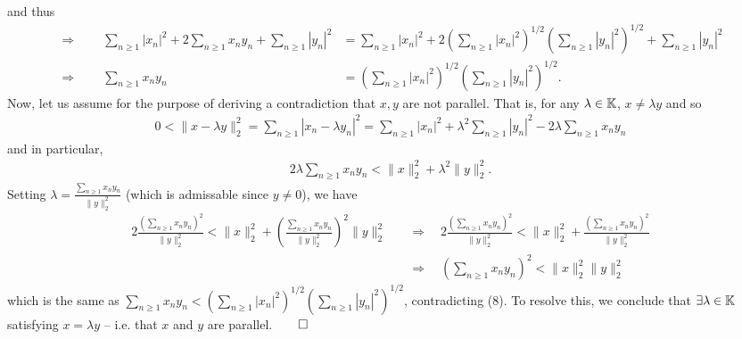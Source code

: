 \documentclass[10pt]{article}
\newcommand{\1}[1]{\mathbbm{1}_{#1}} \newcommand{\mc}[1]{\mathcal{#1}}
\begin{document}
    and thus
    \begin{align*}
        \Rightarrow\qquad\sum_{n\geq 1}|x_n|^2+2\sum_{n\geq 1}x_ny_n+\sum_{n\geq 1}|y_n|^2&=\sum_{n\geq 1}|x_n|^2+2\left(\sum_{n\geq 1}|x_n|^2\right)^{1/2}\left(\sum_{n\geq 1}|y_n|^2\right)^{1/2}+\sum_{n\geq 1}|y_n|^2\\
        \Rightarrow\qquad\sum_{n\geq 1}x_ny_n&=\left(\sum_{n\geq 1}|x_n|^2\right)^{1/2}\left(\sum_{n\geq 1}|y_n|^2\right)^{1/2}.\tag{8}
    \end{align*}
    Now, let us assume for the purpose of deriving a contradiction that $x,y$
    are not parallel. That is, for any $\lambda\in\mathbb{K}$, $x\neq \lambda y$
    and so
    \begin{align*}
        0<\|x-\lambda y\|_2^2=\sum_{n\geq 1}|x_n-\lambda y_n|^2=\sum_{n\geq 1}|x_n|^2+\lambda^2\sum_{n\geq 1}|y_n|^2-2\lambda\sum_{n\geq 1}x_ny_n
    \end{align*}
    and in particular,
    \begin{align*}
        2\lambda\sum_{n\geq 1}x_ny_n<\|x\|^2_2+\lambda^2\|y\|_2^2.
    \end{align*}
    Setting $\lambda=\frac{\sum_{n\geq 1}x_ny_n}{\|y\|_2^2}$ (which is
    admissable since $y\neq 0$), we have
    \begin{align*}
        2\frac{\left(\sum_{n\geq 1}x_ny_n\right)^2}{\|y\|^2_2}<\|x\|^2_2+\left(\frac{\sum_{n\geq 1}x_ny_n}{\|y\|^2_2}\right)^2\|y\|^2_2\quad&\Rightarrow\quad2\frac{\left(\sum_{n\geq 1}x_ny_n\right)^2}{\|y\|^2_2}<\|x\|^2_2+\frac{\left(\sum_{n\geq 1}x_ny_n\right)^2}{\|y\|^2_2}\\
        &\Rightarrow\quad\left(\sum_{n\geq 1}x_ny_n\right)^2<\|x\|^2_2\|y\|^2_2
    \end{align*}
    which is the same as $\sum_{n\geq 1}x_ny_n<(\sum_{n\geq
    1}|x_n|^2)^{1/2}(\sum_{n\geq 1}|y_n|^2)^{1/2}$, contradicting (8). To
    resolve this, we conclude that $\exists\lambda\in\mathbb{K}$ satisfying
    $x=\lambda y$ -- i.e. that $x$ and $y$ are parallel.\hfill{$\qed$}
\end{document}

